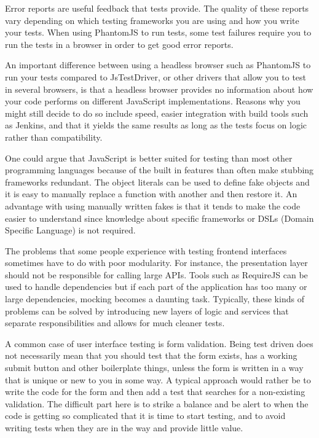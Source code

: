 \documentclass[11pt]{article}
\begin{document}
Error reports are useful feedback that tests provide. The quality of these reports vary depending on which testing frameworks you are using and how you write your tests. When using PhantomJS to run tests, some test failures require you to run the tests in a browser in order to get good error reports. \cite[question~12]{Edelstam}

An important difference between using a headless browser such as PhantomJS to run your tests compared to JsTestDriver, or other drivers that allow you to test in several browsers, is that a headless browser provides no information about how your code performs on different JavaScript implementations. Reasons why you might still decide to do so include speed, easier integration with build tools such as Jenkins, and that it yields the same results as long as the tests focus on logic rather than compatibility. \cite[questions~13-15]{Edelstam}


One could argue that JavaScript is better suited for testing than most other programming languages because of the built in features than often make stubbing frameworks redundant. The object literals can be used to define fake objects and it is easy to manually replace a function with another and then restore it. An advantage with using manually written fakes is that it tends to make the code easier to understand since knowledge about specific frameworks or DSLs (Domain Specific Language) is not required. \cite[questions~20-21]{Edelstam}\label{LiteralFakes}

The problems that some people experience with testing frontend interfaces sometimes have to do with poor modularity. For instance, the presentation layer should not be responsible for calling large APIs. Tools such as RequireJS can be used to handle dependencies but if each part of the application has too many or large dependencies, mocking becomes a daunting task. Typically, these kinds of problems can be solved by introducing new layers of logic and services that separate responsibilities and allows for much cleaner tests. \cite[question~23]{Edelstam}

A common case of user interface testing is form validation. Being test driven does not necessarily mean that you should test that the form exists, has a working submit button and other boilerplate things, unless the form is written in a way that is unique or new to you in some way. A typical approach would rather be to write the code for the form and then add a test that searches for a non-existing validation. The difficult part here is to strike a balance and be alert to when the code is getting so complicated that it is time to start testing, and to avoid writing tests when they are in the way and provide little value. \cite[questions~24-25]{Edelstam}
\end{document}
